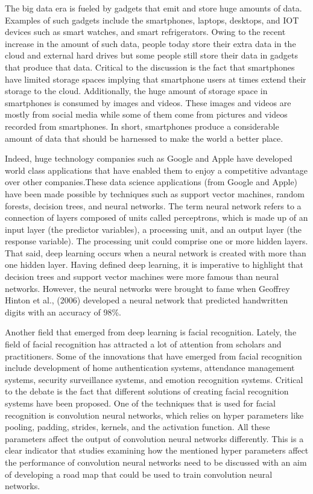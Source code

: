 \documentclass[
  12pt,
]{article}
\begin{document}
The big data era is fueled by gadgets that emit and store huge amounts
of data. Examples of such gadgets include the smartphones, laptops,
desktops, and IOT devices such as smart watches, and smart
refrigerators. Owing to the recent increase in the amount of such data,
people today store their extra data in the cloud and external hard
drives but some people still store their data in gadgets that produce
that data. Critical to the discussion is the fact that smartphones have
limited storage spaces implying that smartphone users at times extend
their storage to the cloud. Additionally, the huge amount of storage
space in smartphones is consumed by images and videos. These images and
videos are mostly from social media while some of them come from
pictures and videos recorded from smartphones. In short, smartphones
produce a considerable amount of data that should be harnessed to make
the world a better place.

Indeed, huge technology companies such as Google and Apple have
developed world class applications that have enabled them to enjoy a
competitive advantage over other companies.These data science
applications (from Google and Apple) have been made possible by
techniques such as support vector machines, random forests, decision
trees, and neural networks. The term neural network refers to a
connection of layers composed of units called perceptrons, which is made
up of an input layer (the predictor variables), a processing unit, and
an output layer (the response variable). The processing unit could
comprise one or more hidden layers. That said, deep learning occurs when
a neural network is created with more than one hidden layer. Having
defined deep learning, it is imperative to highlight that decision trees
and support vector machines were more famous than neural networks.
However, the neural networks were brought to fame when Geoffrey Hinton
et al., (2006) developed a neural network that predicted handwritten
digits with an accuracy of 98\%.

Another field that emerged from deep learning is facial recognition.
Lately, the field of facial recognition has attracted a lot of attention
from scholars and practitioners. Some of the innovations that have
emerged from facial recognition include development of home
authentication systems, attendance management systems, security
surveillance systems, and emotion recognition systems. Critical to the
debate is the fact that different solutions of creating facial
recognition systems have been proposed. One of the techniques that is
used for facial recognition is convolution neural networks, which relies
on hyper parameters like pooling, padding, strides, kernels, and the
activation function. All these parameters affect the output of
convolution neural networks differently. This is a clear indicator that
studies examining how the mentioned hyper parameters affect the
performance of convolution neural networks need to be discussed with an
aim of developing a road map that could be used to train convolution
neural networks.
\end{document}
